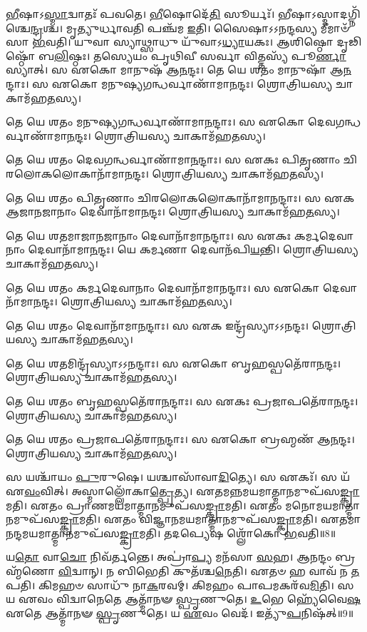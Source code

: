 \-\ul{𑌭𑍀}\-𑌷𑌾𑌽\-\ul{𑌸𑍍𑌮𑌾}\-𑌦𑍍𑌵𑌾𑌤𑌃᳴ 𑌪𑌵𑌤𑍇। 
\-\ul{𑌭𑍀}\-𑌷𑍋𑌦𑍇᳴\-\ul{𑌤𑌿} 𑌸𑍂𑌰𑍍𑌯𑌃᳴। 
𑌭𑍀𑌷𑌾𑌽𑌸𑍍𑌮𑌾𑌦𑌗𑍍𑌨𑌿᳴\-𑌶𑍍𑌚𑍇\-\ul{𑌨𑍍𑌦𑍍𑌰}\-𑌶𑍍𑌚। 
𑌮𑍃𑌤𑍍𑌯𑍁𑌰𑍍𑌧𑌾𑌵𑌤𑌿 𑌪𑌞𑍍𑌚᳴𑌮 \ul{𑌇}\-𑌤𑌿। 
𑌸𑍈𑌷𑌾𑌽𑌽𑌨𑌨𑍍𑌦𑌸𑍍𑌯 𑌮𑍀𑌮𑌾𑍞᳴𑌸𑌾 \ul{𑌭}\-𑌵𑌤𑌿। 
𑌯𑍁𑌵𑌾 𑌸𑍍𑌯𑌾𑌥𑍍𑌸𑌾𑌧𑍁 𑌯𑍁᳴𑌵𑌾𑌽\-\ul{𑌧𑍍𑌯𑌾}\-𑌯𑌕𑌃। 
𑌆𑌶𑌿𑌷𑍍𑌠𑍋 𑌦𑍃𑌢𑌿𑌷𑍍𑌠𑍋᳴ 𑌬\-\ul{𑌲𑌿}\-𑌷𑍍𑌠𑌃। 
𑌤𑌸𑍍𑌯𑍇𑌯𑌂 𑌪𑍃𑌥𑌿𑌵𑍀 𑌸𑌰𑍍𑌵𑌾 𑌵𑌿𑌤𑍍𑌤𑌸𑍍𑌯᳴ 𑌪𑍂\-\ul{𑌰𑍍𑌣𑌾} 𑌸𑍍𑌯𑌾𑌤𑍍। 
𑌸 𑌏𑌕𑍋 𑌮𑌾𑌨𑍁𑌷᳴ 𑌆\-\ul{𑌨}\-𑌨𑍍𑌦𑌃। 
𑌤𑍇 𑌯𑍇 𑌶𑌤𑌂 𑌮𑌾𑌨𑍁𑌷𑌾᳴ 𑌆\-\ul{𑌨}\-𑌨𑍍𑌦𑌾𑌃। 
𑌸 𑌏𑌕𑍋 𑌮𑌨𑍁𑌷𑍍𑌯𑌗𑌨𑍍𑌧𑌰𑍍𑌵𑌾𑌣𑌾᳴\-𑌮𑌾\-\ul{𑌨}\-𑌨𑍍𑌦𑌃। 
𑌶𑍍𑌰𑍋𑌤𑍍𑌰𑌿𑌯𑌸𑍍𑌯 𑌚𑌾𑌕𑌾𑌮᳴𑌹\-\ul{𑌤}\-𑌸𑍍𑌯। 

𑌤𑍇 𑌯𑍇 𑌶𑌤𑌂 𑌮𑌨𑍁𑌷𑍍𑌯𑌗𑌨𑍍𑌧𑌰𑍍𑌵𑌾𑌣𑌾᳴𑌮𑌾\-\ul{𑌨}\-𑌨𑍍𑌦𑌾𑌃। 
𑌸 𑌏𑌕𑍋 𑌦𑍇𑌵𑌗𑌨𑍍𑌧𑌰𑍍𑌵𑌾𑌣𑌾᳴\-𑌮𑌾\-\ul{𑌨}\-𑌨𑍍𑌦𑌃। 
𑌶𑍍𑌰𑍋𑌤𑍍𑌰𑌿𑌯𑌸𑍍𑌯 𑌚𑌾𑌕𑌾𑌮᳴𑌹\-\ul{𑌤}\-𑌸𑍍𑌯। 

𑌤𑍇 𑌯𑍇 𑌶𑌤𑌂 𑌦𑍇𑌵𑌗𑌨𑍍𑌧𑌰𑍍𑌵𑌾𑌣𑌾᳴𑌮𑌾\-\ul{𑌨}\-𑌨𑍍𑌦𑌾𑌃। 
𑌸 𑌏𑌕𑌃 𑌪𑌿𑌤𑍃𑌣𑌾𑌂 𑌚𑌿𑌰𑌲𑍋𑌕𑌲𑍋𑌕𑌾𑌨𑌾᳴\-𑌮𑌾\-\ul{𑌨}\-𑌨𑍍𑌦𑌃। 
𑌶𑍍𑌰𑍋𑌤𑍍𑌰𑌿𑌯𑌸𑍍𑌯 𑌚𑌾𑌕𑌾𑌮᳴𑌹\-\ul{𑌤}\-𑌸𑍍𑌯। 

𑌤𑍇 𑌯𑍇 𑌶𑌤𑌂 𑌪𑌿𑌤𑍃𑌣𑌾𑌂 𑌚𑌿𑌰𑌲𑍋𑌕𑌲𑍋𑌕𑌾𑌨𑌾᳴\-𑌮𑌾\-\ul{𑌨}\-𑌨𑍍𑌦𑌾𑌃। 
𑌸 𑌏𑌕 𑌆𑌜𑌾𑌨𑌜𑌾𑌨𑌾𑌂 𑌦𑍇𑌵𑌾𑌨𑌾᳴\-𑌮𑌾\-\ul{𑌨}\-𑌨𑍍𑌦𑌃। 
𑌶𑍍𑌰𑍋𑌤𑍍𑌰𑌿𑌯𑌸𑍍𑌯 𑌚𑌾𑌕𑌾𑌮᳴𑌹\-\ul{𑌤}\-𑌸𑍍𑌯। 

𑌤𑍇 𑌯𑍇 𑌶𑌤𑌮𑌾𑌜𑌾𑌨𑌜𑌾𑌨𑌾𑌂 𑌦𑍇𑌵𑌾𑌨𑌾᳴𑌮𑌾\-\ul{𑌨}\-𑌨𑍍𑌦𑌾𑌃। 
𑌸 𑌏𑌕𑌃 𑌕𑌰𑍍𑌮𑌦𑍇𑌵𑌾𑌨𑌾𑌂 𑌦𑍇𑌵𑌾𑌨𑌾᳴\-𑌮𑌾\-\ul{𑌨}\-𑌨𑍍𑌦𑌃। 
𑌯𑍇 𑌕𑌰𑍍𑌮𑌣𑌾 𑌦𑍇𑌵𑌾𑌨᳴𑌪𑌿\-\ul{𑌯}\-𑌨𑍍𑌤𑌿। 
𑌶𑍍𑌰𑍋𑌤𑍍𑌰𑌿𑌯𑌸𑍍𑌯 𑌚𑌾𑌕𑌾𑌮᳴𑌹\-\ul{𑌤}\-𑌸𑍍𑌯। 

𑌤𑍇 𑌯𑍇 𑌶𑌤𑌂 𑌕𑌰𑍍𑌮𑌦𑍇𑌵𑌾𑌨𑌾𑌂 𑌦𑍇𑌵𑌾𑌨𑌾᳴𑌮𑌾\-\ul{𑌨}\-𑌨𑍍𑌦𑌾𑌃। 
𑌸 𑌏𑌕𑍋 𑌦𑍇𑌵𑌾𑌨𑌾᳴\-𑌮𑌾\-\ul{𑌨}\-𑌨𑍍𑌦𑌃। 
𑌶𑍍𑌰𑍋𑌤𑍍𑌰𑌿𑌯𑌸𑍍𑌯 𑌚𑌾𑌕𑌾𑌮᳴𑌹\-\ul{𑌤}\-𑌸𑍍𑌯। 

𑌤𑍇 𑌯𑍇 𑌶𑌤𑌂 𑌦𑍇𑌵𑌾𑌨𑌾᳴𑌮𑌾\-\ul{𑌨}\-𑌨𑍍𑌦𑌾𑌃। 
𑌸 𑌏𑌕 𑌇𑌨𑍍𑌦𑍍𑌰᳴𑌸𑍍𑌯𑌾𑌽𑌽\-\ul{𑌨}\-𑌨𑍍𑌦𑌃। 
𑌶𑍍𑌰𑍋𑌤𑍍𑌰𑌿𑌯𑌸𑍍𑌯 𑌚𑌾𑌕𑌾𑌮᳴𑌹\-\ul{𑌤}\-𑌸𑍍𑌯। 

𑌤𑍇 𑌯𑍇 𑌶𑌤𑌮𑌿𑌨𑍍𑌦𑍍𑌰᳴𑌸𑍍𑌯𑌾𑌽𑌽\-\ul{𑌨}\-𑌨𑍍𑌦𑌾𑌃। 
𑌸 𑌏𑌕𑍋 𑌬𑍃𑌹𑌸𑍍𑌪𑌤𑍇᳴𑌰𑌾\-\ul{𑌨}\-𑌨𑍍𑌦𑌃। 
𑌶𑍍𑌰𑍋𑌤𑍍𑌰𑌿𑌯𑌸𑍍𑌯 𑌚𑌾𑌕𑌾𑌮᳴𑌹\-\ul{𑌤}\-𑌸𑍍𑌯। 

𑌤𑍇 𑌯𑍇 𑌶𑌤𑌂 𑌬𑍃𑌹𑌸𑍍𑌪𑌤𑍇᳴𑌰𑌾\-\ul{𑌨}\-𑌨𑍍𑌦𑌾𑌃। 
𑌸 𑌏𑌕𑌃 𑌪𑍍𑌰𑌜𑌾𑌪𑌤𑍇᳴𑌰𑌾\-\ul{𑌨}\-𑌨𑍍𑌦𑌃। 
𑌶𑍍𑌰𑍋𑌤𑍍𑌰𑌿𑌯𑌸𑍍𑌯 𑌚𑌾𑌕𑌾𑌮᳴𑌹\-\ul{𑌤}\-𑌸𑍍𑌯। 

𑌤𑍇 𑌯𑍇 𑌶𑌤𑌂 𑌪𑍍𑌰𑌜𑌾𑌪𑌤𑍇᳴𑌰𑌾\-\ul{𑌨}\-𑌨𑍍𑌦𑌾𑌃। 
𑌸 𑌏𑌕𑍋 𑌬𑍍𑌰𑌹𑍍𑌮𑌣᳴ 𑌆\-\ul{𑌨}\-𑌨𑍍𑌦𑌃। 
𑌶𑍍𑌰𑍋𑌤𑍍𑌰𑌿𑌯𑌸𑍍𑌯 𑌚𑌾𑌕𑌾𑌮᳴𑌹\-\ul{𑌤}\-𑌸𑍍𑌯। 

𑌸 𑌯𑌶𑍍𑌚𑌾᳴𑌯𑌂 \ul{𑌪𑍁}\-𑌰𑍁𑌷𑍇। 
𑌯𑌶𑍍𑌚𑌾𑌸𑌾᳴𑌵𑌾\-\ul{𑌦𑌿}\-𑌤𑍍𑌯𑍇। 
𑌸 𑌏𑌕𑌃᳴। 
𑌸 𑌯᳴ 𑌏\-\ul{𑌵𑌂}\-𑌵𑌿𑌤𑍍। 
𑌅𑌸𑍍𑌮𑌾𑌲𑍍𑌲𑍋᳴𑌕𑌾\-\ul{𑌤𑍍𑌪𑍍𑌰𑍇}\-𑌤𑍍𑌯। 
𑌏𑌤𑌮𑌨𑍍𑌨𑌮𑌯𑌮𑌾𑌤𑍍𑌮𑌾𑌨𑌮𑍁𑌪᳴𑌸\-\ul{𑌙𑍍𑌕𑍍𑌰𑌾}\-𑌮𑌤𑌿। 
𑌏𑌤𑌂 𑌪𑍍𑌰𑌾𑌣𑌮𑌯𑌮𑌾𑌤𑍍𑌮𑌾𑌨𑌮𑍁𑌪᳴𑌸\-\ul{𑌙𑍍𑌕𑍍𑌰𑌾}\-𑌮𑌤𑌿। 
𑌏𑌤𑌂 𑌮𑌨𑍋𑌮𑌯𑌮𑌾𑌤𑍍𑌮𑌾𑌨𑌮𑍁𑌪᳴\-𑌸\-\ul{𑌙𑍍𑌕𑍍𑌰𑌾}\-𑌮𑌤𑌿। 
𑌏𑌤𑌂 𑌵𑌿𑌜𑍍𑌞𑌾𑌨𑌮𑌯𑌮𑌾𑌤𑍍𑌮𑌾𑌨𑌮𑍁𑌪᳴\-𑌸\-\ul{𑌙𑍍𑌕𑍍𑌰𑌾}\-𑌮𑌤𑌿। 
𑌏𑌤𑌮𑌾𑌨𑌨𑍍𑌦\-𑌮𑌯𑌮𑌾𑌤𑍍𑌮𑌾𑌨𑌮𑍁𑌪᳴\-𑌸\-\ul{𑌙𑍍𑌕𑍍𑌰𑌾}\-𑌮𑌤𑌿। 
𑌤𑌦𑌪𑍍𑌯𑍇𑌷 𑌶𑍍𑌲𑍋᳴𑌕𑍋 \ul{𑌭}\-𑌵𑌤𑌿॥8॥

𑌯\-\ul{𑌤𑍋} 𑌵𑌾\-\ul{𑌚𑍋} 𑌨𑌿𑌵᳴𑌰𑍍𑌤𑌨𑍍𑌤𑍇। 
𑌅𑌪𑍍𑌰𑌾॑\-\ul{𑌪𑍍𑌯} 𑌮𑌨᳴𑌸𑌾 \ul{𑌸}\-𑌹। 
𑌆𑌨𑌨𑍍𑌦𑌂 𑌬𑍍𑌰𑌹𑍍𑌮᳴𑌣𑍋 \ul{𑌵𑌿}\-𑌦𑍍𑌵𑌾𑌨𑍍। 
𑌨 𑌬𑌿𑌭𑍇𑌤𑌿 𑌕𑍁𑌤᳴𑌶𑍍𑌚\-\ul{𑌨𑍇}\-𑌤𑌿। 
𑌏𑌤𑍞 𑌹 𑌵𑌾𑌵᳴ 𑌨 \ul{𑌤}\-𑌪𑌤𑌿। 
𑌕𑌿𑌮𑌹𑍞 𑌸𑌾𑌧𑍁᳴ 𑌨𑌾\-\ul{𑌕}\-𑌰𑌵𑌮𑍍। 
𑌕𑌿𑌮𑌹𑌂 𑌪𑌾𑌪𑌮𑌕𑌰᳴𑌵\-\ul{𑌮𑌿}\-𑌤𑌿। 
𑌸 𑌯 𑌏𑌵𑌂 𑌵𑌿𑌦𑍍𑌵𑌾𑌨𑍇𑌤𑍇 𑌆𑌤𑍍𑌮𑌾᳴𑌨𑍟 \ul{𑌸𑍍𑌪𑍃}\-𑌣𑍁𑌤𑍇। 
\-\ul{𑌉}\-𑌭𑍇 𑌹𑍍𑌯𑍇᳴𑌵𑍈\-\ul{𑌷} 𑌏𑌤𑍇 𑌆𑌤𑍍𑌮𑌾᳴𑌨𑍟 \ul{𑌸𑍍𑌪𑍃}\-𑌣𑍁𑌤𑍇। 
𑌯 \ul{𑌏}\-𑌵𑌂 𑌵𑍇𑌦᳴। 
𑌇𑌤𑍍𑌯𑍁᳴\-\ul{𑌪}\-𑌨𑌿𑌷᳴𑌤𑍍॥9॥

